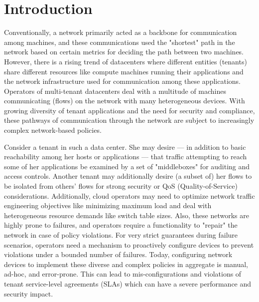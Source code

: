 \section{Introduction}
Conventionally, a network primarily acted as a backbone for 
communication among machines, and these communications
used the "shortest" path in the network based on certain metrics
for deciding the path between two machines. 
However, there is a rising trend of datacenters where
different entities (tenants) share different resources like compute
machines running their applications and 
the network infrastructure used for communication 
among these applications.  
Operators of multi-tenant datacenters deal with a multitude of
machines communicating (flows) on the network 
with many heterogeneous devices. With growing
diversity of tenant applications and the 
need for security and compliance, 
these pathways of communication
through the network are subject to
increasingly complex network-based policies.

Consider a tenant in such a data center. She may desire --- in addition
to basic reachability among her hosts or applications --- that traffic
attempting to reach some of her applications be examined by a set of
"middleboxes" for auditing and access controls. Another tenant may
additionally desire (a subset of) her flows to be isolated from
others' flows for strong security or QoS (Quality-of-Service) considerations.
 Additionally,
cloud operators may need to optimize network traffic engineering objectives
like minimizing maximum load 
and deal with heterogeneous resource demands like switch table 
sizes. Also, these networks are highly prone to failures,
and operators require a functionality to "repair" the network
 in case of  policy 
violations. For very strict guarantees during failure scenarios,
operators need a mechanism to proactively configure devices to 
prevent violations under a bounded number of failures. 
Today, configuring network devices to implement these diverse
and complex policies in aggregate is manual, ad-hoc, and error-prone. 
This can lead to mis-configurations and violations of tenant
service-level agreements (SLAs) which can have a severe performance and
security impact.


